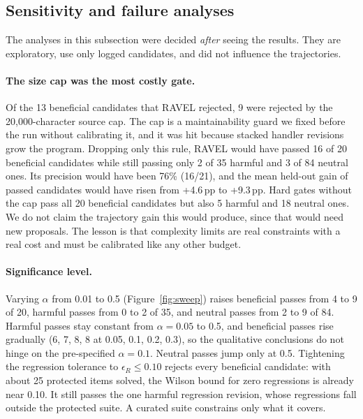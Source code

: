 \subsection{Sensitivity and failure analyses}
\label{sec:res-sens}
The analyses in this subsection were decided \emph{after} seeing the results. They are exploratory,
use only logged candidates, and did not influence the trajectories.

\paragraph{The size cap was the most costly gate.}
Of the 13 beneficial candidates that RAVEL rejected, 9 were rejected by the 20{,}000-character source cap.
The cap is a maintainability guard we fixed before the run without calibrating it, and it was hit
because stacked handler revisions grow the program. Dropping only this rule, RAVEL would have passed 16 of
20 beneficial candidates while still passing only 2 of 35 harmful and 3 of 84 neutral ones. Its precision
would have been 76\% (16/21), and the mean held-out gain of passed candidates would have risen from
+4.6\,pp to +9.3\,pp. Hard gates without the cap pass all 20 beneficial candidates but also 5 harmful and
18 neutral ones. We do not claim the trajectory gain this would produce, since that would need new
proposals. The lesson is that complexity limits are real constraints with a real cost and must be
calibrated like any other budget.

\paragraph{Significance level.}
Varying $\alpha$ from 0.01 to 0.5 (Figure~\ref{fig:sweep}) raises beneficial passes from 4 to 9 of 20,
harmful passes from 0 to 2 of 35, and neutral passes from 2 to 9 of 84. Harmful passes stay constant
from $\alpha=0.05$ to 0.5, and beneficial passes rise gradually (6, 7, 8, 8 at 0.05, 0.1, 0.2, 0.3), so
the qualitative conclusions do not hinge on the pre-specified $\alpha=0.1$. Neutral passes jump only at
0.5. Tightening the regression tolerance to $\epsilon_R \le 0.10$ rejects every beneficial candidate:
with about 25 protected items solved, the Wilson bound for zero regressions is already near 0.10. It still
passes the one harmful regression revision, whose regressions fall outside the protected suite. A curated
suite constrains only what it covers.

